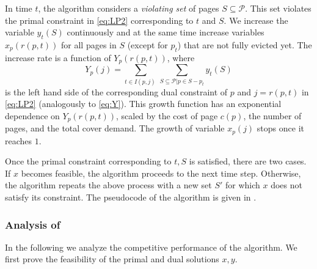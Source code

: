 \documentclass[11pt]{article}
\newcommand{\cP}{{\mathcal{P}}}
\begin{document}
In time $t$, the algorithm considers a {\em violating set} of pages $S \subseteq \cP$. This set violates the primal constraint in \eqref{eq:LP2} corresponding to $t$ and $S$. %
We increase the variable $y_{t}(S)$ continuously and at the same time increase variables $x_p(r(p,t))$ for all pages in $S$ (except for $p_t$) that are not fully evicted yet. The increase rate is a function of $Y_p(r(p,t))$, where %
\begin{equation}
	\label{eq:Y2-appendix}
	Y_p(j) =\sum_{t \in I(p,j)~} \sum_{S \subseteq \cP \big|p \in S-p_t} y_t(S)
\end{equation}  is the left hand side of the corresponding dual constraint of $p$ and $j = r(p,t)$ in \eqref{eq:LP2} (analogously to \eqref{eq:Y}). This growth function has an exponential dependence on $Y_p(r(p,t))$, scaled by the cost of page $c(p)$, the number of pages, and the total cover demand. The growth of variable $x_p(j)$ stops once it reaches $1$. %








Once the primal constraint corresponding to $t,S$ is satisfied, there are two cases. If $x$ becomes feasible, the algorithm proceeds to the next time step. Otherwise, the algorithm repeats the above process with a new set $S'$ for which $x$ does not satisfy its constraint. The pseudocode of the algorithm is given in . 


\subsubsection*{Analysis of }
In the following we analyze the competitive performance of the algorithm.  We first prove the feasibility of the primal and dual solutions $x,y$. %
\end{document}
